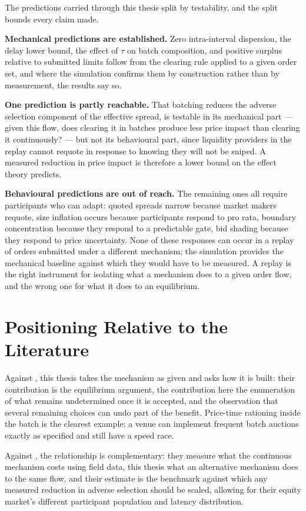 The predictions carried through this thesis split by testability, and
the split bounds every claim made.

\textbf{Mechanical predictions are established.} Zero intra-interval
dispersion, the delay lower bound, the effect of $\tau$ on batch
composition, and positive surplus relative to submitted limits follow
from the clearing rule applied to a given order set, and where the
simulation confirms them by construction rather than by measurement, the
results say so.

\textbf{One prediction is partly reachable.} That batching reduces the
adverse selection component of the effective spread, is testable in its
mechanical part --- given this flow, does clearing it in batches produce
less price impact than clearing it continuously? --- but not its
behavioural part, since liquidity providers in the replay cannot requote in
response to knowing they will not be sniped. A measured reduction in price
impact is therefore a lower bound on the effect theory predicts.

\textbf{Behavioural predictions are out of reach.} The remaining ones all
require participants who can adapt: quoted spreads narrow because market
makers requote, size inflation occurs because participants respond to pro
rata, boundary concentration because they respond to a predictable gate,
bid shading because they respond to price uncertainty. None of these
responses can occur in a replay of orders submitted under a different
mechanism; the simulation provides the mechanical baseline against which
they would have to be measured. A replay is the right instrument for
isolating what a mechanism does to a given order flow, and the wrong one
for what it does to an equilibrium.

\section{Positioning Relative to the Literature}
\label{sec:positioning}

Against \citet{budish2015hft}, this thesis takes the mechanism as given and
asks how it is built: their contribution is the equilibrium argument, the
contribution here the enumeration of what remains undetermined once it is
accepted, and the observation that several remaining choices can undo part
of the benefit. Price-time rationing inside the batch is the clearest
example: a venue can implement frequent batch auctions exactly as specified
and still have a speed race.

Against \citet{aquilina2022quantifying}, the relationship is complementary:
they measure what the continuous mechanism costs using field data, this
thesis what an alternative mechanism does to the same flow, and their
estimate is the benchmark against which any measured reduction in adverse
selection should be scaled, allowing for their equity market's different
participant population and latency distribution.

